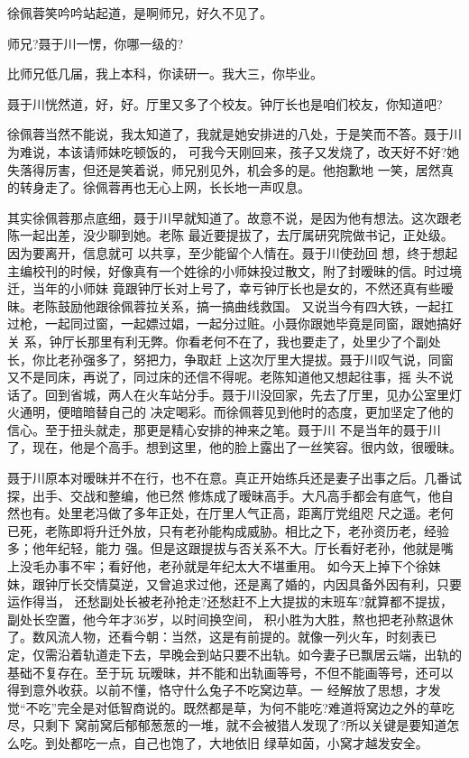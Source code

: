 \documentclass[11pt,a4paper,onecolumn]{article}
\begin{document}
徐佩蓉笑吟吟站起道，是啊师兄，好久不见了。

师兄?聂于川一愣，你哪一级的?

比师兄低几届，我上本科，你读研一。我大三，你毕业。

聂于川恍然道，好，好。厅里又多了个校友。钟厅长也是咱们校友，你知道吧?

徐佩蓉当然不能说，我太知道了，我就是她安排进的八处，于是笑而不答。聂于川为难说，本该请师妹吃顿饭的，
可我今天刚回来，孩子又发烧了，改天好不好?她失落得厉害，但还是笑着说，师兄别见外，机会多的是。他抱歉地
一笑，居然真的转身走了。徐佩蓉再也无心上网，长长地一声叹息。

其实徐佩蓉那点底细，聂于川早就知道了。故意不说，是因为他有想法。这次跟老陈一起出差，没少聊到她。老陈
最近要提拔了，去厅属研究院做书记，正处级。因为要离开，信息就可 以共享，至少能留个人情在。聂于川使劲回
想，终于想起主编校刊的时候，好像真有一个姓徐的小师妹投过散文，附了封暧昧的信。时过境迁，当年的小师妹
竟跟钟厅长对上号了，幸亏钟厅长也是女的，不然还真有些暧昧。老陈鼓励他跟徐佩蓉拉关系，搞一搞曲线救国。
又说当今有四大铁，一起扛过枪，一起同过窗，一起嫖过娼，一起分过赃。小聂你跟她毕竟是同窗，跟她搞好关
系，钟厅长那里有利无弊。你看老何不在了，我也要走了，处里少了个副处长，你比老孙强多了，努把力，争取赶
上这次厅里大提拔。聂于川叹气说，同窗又不是同床，再说了，同过床的还信不得呢。老陈知道他又想起往事，摇
头不说话了。回到省城，两人在火车站分手。聂于川没回家，先去了厅里，见办公室里灯火通明，便暗暗替自己的
决定喝彩。而徐佩蓉见到他时的态度，更加坚定了他的信心。至于扭头就走，那更是精心安排的神来之笔。聂于川
不是当年的聂于川了，现在，他是个高手。想到这里，他的脸上露出了一丝笑容。很内敛，很暧昧。

聂于川原本对暧昧并不在行，也不在意。真正开始练兵还是妻子出事之后。几番试探，出手、交战和整编，他已然
修炼成了暧昧高手。大凡高手都会有底气，他自然也有。处里老冯做了多年正处，在厅里人气正高，距离厅党组咫
尺之遥。老何已死，老陈即将升迁外放，只有老孙能构成威胁。相比之下，老孙资历老，经验多；他年纪轻，能力
强。但是这跟提拔与否关系不大。厅长看好老孙，他就是嘴上没毛办事不牢；看好他，老孙就是年纪太大不堪重用。
如今天上掉下个徐妹妹，跟钟厅长交情莫逆，又曾追求过他，还是离了婚的，内因具备外因有利，只要运作得当，
还愁副处长被老孙抢走?还愁赶不上大提拔的末班车?就算都不提拔，副处长空置，他今年才36岁，以时间换空间，
积小胜为大胜，熬也把老孙熬退休了。数风流人物，还看今朝：当然，这是有前提的。就像一列火车，时刻表已
定，仅需沿着轨道走下去，早晚会到站\myrule{}只要不出轨。如今妻子已飘居云端，出轨的基础不复存在。至于玩
玩暧昧，并不能和出轨画等号，不但不能画等号，还可以得到意外收获。以前不懂，恪守什么兔子不吃窝边草。一
经解放了思想，才发觉“不吃”完全是对低智商说的。既然都是草，为何不能吃?难道将窝边之外的草吃尽，只剩下
窝前窝后郁郁葱葱的一堆，就不会被猎人发现了?所以关键是要知道怎么吃。到处都吃一点，自己也饱了，大地依旧
绿草如茵，小窝才越发安全。
\end{document}

